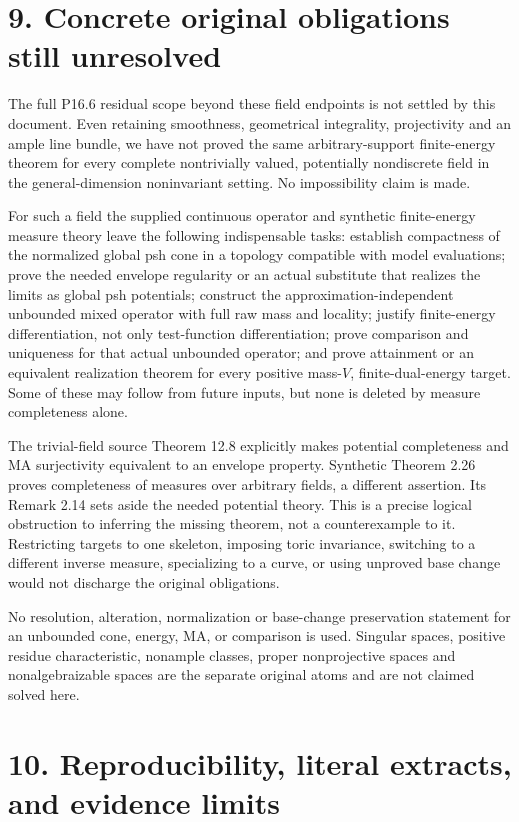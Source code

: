 \documentclass[11pt]{article}
\begin{document}
\section*{9. Concrete original obligations still unresolved}

The full P16.6 residual scope beyond these field endpoints is not settled by this document. Even retaining smoothness, geometrical integrality, projectivity and an ample line bundle, we have not proved the same arbitrary-support finite-energy theorem for every complete nontrivially valued, potentially nondiscrete field in the general-dimension noninvariant setting. No impossibility claim is made.

For such a field the supplied continuous operator and synthetic finite-energy measure theory leave the following indispensable tasks: establish compactness of the normalized global psh cone in a topology compatible with model evaluations; prove the needed envelope regularity or an actual substitute that realizes the limits as global psh potentials; construct the approximation-independent unbounded mixed operator with full raw mass and locality; justify finite-energy differentiation, not only test-function differentiation; prove comparison and uniqueness for that actual unbounded operator; and prove attainment or an equivalent realization theorem for every positive mass-\(V\), finite-dual-energy target. Some of these may follow from future inputs, but none is deleted by measure completeness alone.

The trivial-field source Theorem 12.8 explicitly makes potential completeness and MA surjectivity equivalent to an envelope property. Synthetic Theorem 2.26 proves completeness of measures over arbitrary fields, a different assertion. Its Remark 2.14 sets aside the needed potential theory. This is a precise logical obstruction to inferring the missing theorem, not a counterexample to it. Restricting targets to one skeleton, imposing toric invariance, switching to a different inverse measure, specializing to a curve, or using unproved base change would not discharge the original obligations.

No resolution, alteration, normalization or base-change preservation statement for an unbounded cone, energy, MA, or comparison is used. Singular spaces, positive residue characteristic, nonample classes, proper nonprojective spaces and nonalgebraizable spaces are the separate original atoms and are not claimed solved here.

\section*{10. Reproducibility, literal extracts, and evidence limits}
\end{document}

